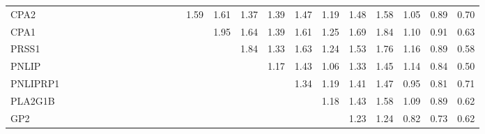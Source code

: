 \begin{longtable}{lrrrrrrrrrrrrrrrrrrrrrrr}
CPA2     &              &              &              &              &             &             &             &             &            &              &            &            &       1.59 &        1.61 &        1.37 &           1.39 &          1.47 &      1.19 &        1.48 &        1.58 &       1.05 &        0.89 &        0.70 \\
CPA1     &              &              &              &              &             &             &             &             &            &              &            &            &            &        1.95 &        1.64 &           1.39 &          1.61 &      1.25 &        1.69 &        1.84 &       1.10 &        0.91 &        0.63 \\
PRSS1    &              &              &              &              &             &             &             &             &            &              &            &            &            &             &        1.84 &           1.33 &          1.63 &      1.24 &        1.53 &        1.76 &       1.16 &        0.89 &        0.58 \\
PNLIP    &              &              &              &              &             &             &             &             &            &              &            &            &            &             &             &           1.17 &          1.43 &      1.06 &        1.33 &        1.45 &       1.14 &        0.84 &        0.50 \\
PNLIPRP1 &              &              &              &              &             &             &             &             &            &              &            &            &            &             &             &                &          1.34 &      1.19 &        1.41 &        1.47 &       0.95 &        0.81 &        0.71 \\
PLA2G1B  &              &              &              &              &             &             &             &             &            &              &            &            &            &             &             &                &               &      1.18 &        1.43 &        1.58 &       1.09 &        0.89 &        0.62 \\
GP2      &              &              &              &              &             &             &             &             &            &              &            &            &            &             &             &                &               &           &        1.23 &        1.24 &       0.82 &        0.73 &        0.62 \\

\end{longtable}

